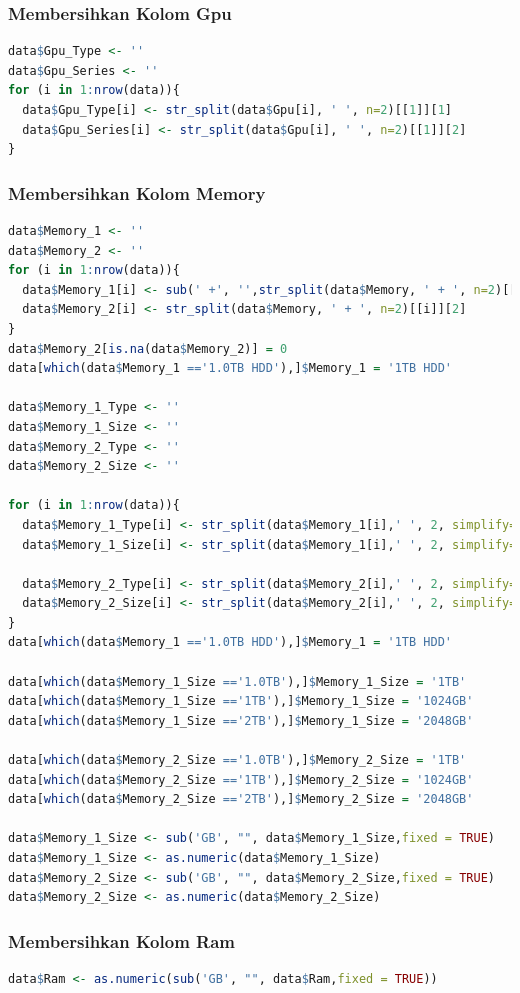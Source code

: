 \documentclass[12pt]{article}
\begin{document}
\subsubsection{Membersihkan Kolom Gpu}
\begin{lstlisting}[language=R]
data$Gpu_Type <- ''
data$Gpu_Series <- ''
for (i in 1:nrow(data)){
  data$Gpu_Type[i] <- str_split(data$Gpu[i], ' ', n=2)[[1]][1]
  data$Gpu_Series[i] <- str_split(data$Gpu[i], ' ', n=2)[[1]][2]
}
\end{lstlisting}
\subsubsection{Membersihkan Kolom Memory}
\begin{lstlisting}[language=R]
data$Memory_1 <- ''
data$Memory_2 <- ''
for (i in 1:nrow(data)){
  data$Memory_1[i] <- sub(' +', '',str_split(data$Memory, ' + ', n=2)[[i]][1],fixed=TRUE)
  data$Memory_2[i] <- str_split(data$Memory, ' + ', n=2)[[i]][2]
}
data$Memory_2[is.na(data$Memory_2)] = 0
data[which(data$Memory_1 =='1.0TB HDD'),]$Memory_1 = '1TB HDD'

data$Memory_1_Type <- ''
data$Memory_1_Size <- ''
data$Memory_2_Type <- ''
data$Memory_2_Size <- ''

for (i in 1:nrow(data)){ 
  data$Memory_1_Type[i] <- str_split(data$Memory_1[i],' ', 2, simplify= T)[1,2]
  data$Memory_1_Size[i] <- str_split(data$Memory_1[i],' ', 2, simplify= T)[1,1]
  
  data$Memory_2_Type[i] <- str_split(data$Memory_2[i],' ', 2, simplify= T)[1,2]
  data$Memory_2_Size[i] <- str_split(data$Memory_2[i],' ', 2, simplify= T)[1,1]
}
data[which(data$Memory_1 =='1.0TB HDD'),]$Memory_1 = '1TB HDD'

data[which(data$Memory_1_Size =='1.0TB'),]$Memory_1_Size = '1TB'
data[which(data$Memory_1_Size =='1TB'),]$Memory_1_Size = '1024GB'
data[which(data$Memory_1_Size =='2TB'),]$Memory_1_Size = '2048GB'

data[which(data$Memory_2_Size =='1.0TB'),]$Memory_2_Size = '1TB'
data[which(data$Memory_2_Size =='1TB'),]$Memory_2_Size = '1024GB'
data[which(data$Memory_2_Size =='2TB'),]$Memory_2_Size = '2048GB'

data$Memory_1_Size <- sub('GB', "", data$Memory_1_Size,fixed = TRUE)
data$Memory_1_Size <- as.numeric(data$Memory_1_Size)
data$Memory_2_Size <- sub('GB', "", data$Memory_2_Size,fixed = TRUE)
data$Memory_2_Size <- as.numeric(data$Memory_2_Size)
\end{lstlisting}
\subsubsection{Membersihkan Kolom Ram}
\begin{lstlisting}[language=R]
data$Ram <- as.numeric(sub('GB', "", data$Ram,fixed = TRUE))
\end{lstlisting}
\end{document}
